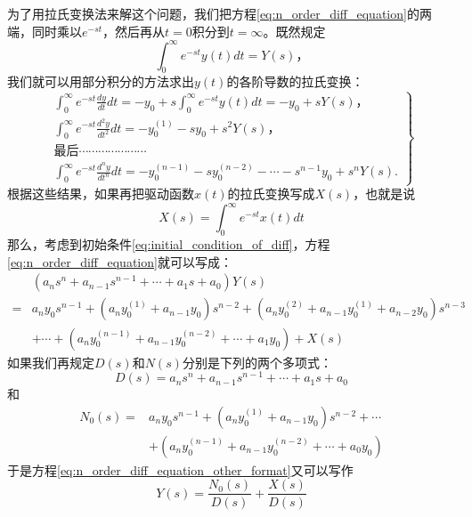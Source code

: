 为了用拉氏变换法来解这个问题，我们把方程\eqref{eq:n_order_diff_equation}的两端，同时乘以$e^{-st}$，然后再从$t=0$积分到$t=\infty$。既然规定
\begin{equation}
\int_0^\infty e^{-st} y(t)dt = Y(s)，\tag{2.1a}
\end{equation}
我们就可以用部分积分的方法求出$y(t)$的各阶导数的拉氏变换：
\begin{equation}
\left.
\begin{array}{l}
\int_0^\infty e^{-st} \frac{dy}{dt} dt = -y_0 + s \int_0^\infty e^{-st} y(t) dt = -y_0 + s Y(s)， \\
\int_0^\infty e^{-st} \frac{d^2y}{dt^2} dt = -y_0^{(1)} - s y_0 + s^2 Y(s)， \\
\mbox{最后} \cdots\cdots\cdots\cdots\cdots\cdots\cdots \\
\int_0^\infty e^{-st} \frac{d^n y}{dt^n} dt = -y_0^{(n - 1)} - s y_0^{(n - 2)} - \cdots - s^{n - 1} y_0 + s^n Y(s).
\end{array}
\right\}
\end{equation}
根据这些结果，如果再把驱动函数$x(t)$的拉氏变换写成$X(s)$，也就是说
\begin{equation}
X(s)=\int_{0}^{\infty} e^{-st}x(t)dt
\end{equation}
那么，考虑到初始条件\eqref{eq:initial_condition_of_diff}，方程\eqref{eq:n_order_diff_equation}就可以写成：
\begin{align}\label{eq:n_order_diff_equation_other_format}
&(a_ns^n + a_{n - 1}s^{n - 1}+\cdots+a_1s + a_0)Y(s)\nonumber\\
=&a_ny_0s^{n - 1}+(a_ny_0^{(1)}+a_{n - 1}y_0)s^{n - 2}+(a_ny_0^{(2)}+a_{n - 1}y_0^{(1)}+a_{n - 2}y_0)s^{n - 3}\nonumber\\
&+\cdots+(a_ny_0^{(n - 1)}+a_{n - 1}y_0^{(n - 2)}+\cdots+a_1y_0)+X(s)
\end{align}
如果我们再规定$D(s)$和$N(s)$分别是下列的两个多项式：
\begin{equation}\label{eq:denominator_of_lap}
D(s)=a_ns^n + a_{n - 1}s^{n - 1}+\cdots+a_1s + a_0
\end{equation}
和
\begin{align}\label{eq:numerator_of_lap}
N_0(s)=&a_ny_0s^{n - 1}+(a_ny_0^{(1)}+a_{n - 1}y_0)s^{n - 2}+\cdots\nonumber\\
&+(a_ny_0^{(n - 1)}+a_{n - 1}y_0^{(n - 2)}+\cdots+a_0y_0)
\end{align}
于是方程\eqref{eq:n_order_diff_equation_other_format}又可以写作
\begin{equation}\label{eq:n_order_diff_equation_lap}
Y(s)=\frac{N_0(s)}{D(s)}+\frac{X(s)}{D(s)}
\end{equation}

